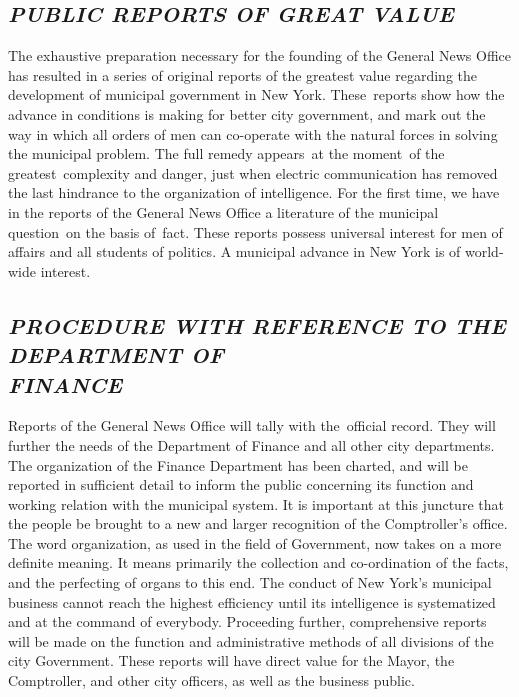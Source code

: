 \documentclass[twoside,symmetric,nobib,justified]{tufte-book}
\begin{document}
\hypertarget{public-reports-of-great-value}{%
\subsection{\emph{PUBLIC REPORTS OF GREAT
VALUE}}\label{public-reports-of-great-value}}

The exhaustive preparation necessary for the founding of the General
News Office has resulted in a series of original reports of the greatest
value regarding the development of municipal government in New York.
These~reports show how the advance in conditions is making for better
city government, and mark out the way in which all orders of men can
co-operate with the natural forces in solving the municipal problem. The
full remedy appears~at the moment~of the greatest~complexity and danger,
just when electric communication has removed the last hindrance to the
organization of intelligence. For the first time, we have in the reports
of the General News Office a literature of the municipal question~on the
basis of~fact. These reports possess universal interest for men of
affairs and all students of politics. A municipal advance in New York is
of world-wide interest.~

\hypertarget{procedure-with-reference-to-the-department-of-finance}{%
\subsection{\emph{PROCEDURE WITH REFERENCE TO THE DEPARTMENT OF\\\noindent FINANCE}}\label{procedure-with-reference-to-the-department-of-finance}}

Reports of the General News Office will tally with the~official record.
They will further the needs of the Department of Finance and all other
city departments. The organization of the Finance Department has been
charted, and will be reported in sufficient detail to inform the public
concerning its function and working relation with the municipal system.
It is important at this juncture that the people be brought to a new and
larger recognition of the Comptroller's office. The word organization,
as used in the field of Government, now takes on a more definite
meaning. It means primarily the collection and co-ordination of the
facts, and the perfecting of organs to this end. The conduct of New
York's municipal business cannot reach the highest efficiency until its
intelligence is systematized and at the command of everybody. Proceeding
further, comprehensive reports will be made on the function and
administrative methods of all divisions of the city Government. These
reports will have direct value for the Mayor, the Comptroller, and other
city officers, as well as the business public.~
\end{document}

